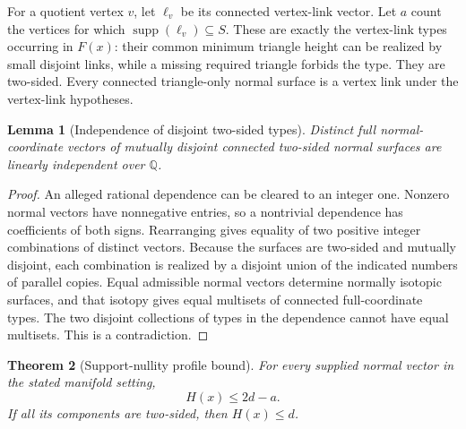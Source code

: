 \documentclass[11pt,a4paper]{article}
\newtheorem{theorem}{Theorem}[section]
\newtheorem{lemma}[theorem]{Lemma}
\theoremstyle{definition}
\newcommand{\Q}{\mathbb Q}
\newcommand{\supp}{\operatorname{supp}}
\begin{document}
For a quotient vertex $v$, let $\ell_v$ be its connected vertex-link vector.
Let $a$ count the vertices for which $\supp(\ell_v)\subseteq S$.  These are
exactly the vertex-link types occurring in $F(x)$: their common minimum
triangle height can be realized by small disjoint links, while a missing
required triangle forbids the type.  They are two-sided.  Every connected
triangle-only normal surface is a vertex link under the vertex-link hypotheses.

\begin{lemma}[Independence of disjoint two-sided types]
\label{lem:independence}
Distinct full normal-coordinate vectors of mutually disjoint connected
two-sided normal surfaces are linearly independent over $\Q$.
\end{lemma}

\begin{proof}
An alleged rational dependence can be cleared to an integer one.  Nonzero
normal vectors have nonnegative entries, so a nontrivial dependence has
coefficients of both signs.  Rearranging gives equality of two positive
integer combinations of distinct vectors.  Because the surfaces are
two-sided and mutually disjoint, each combination is realized by a disjoint
union of the indicated numbers of parallel copies.  Equal admissible normal
vectors determine normally isotopic surfaces, and that isotopy gives equal
multisets of connected full-coordinate types.  The two disjoint collections
of types in the dependence cannot have equal multisets.  This is a contradiction.
\end{proof}

\begin{theorem}[Support-nullity profile bound]
\label{thm:profile}
For every supplied normal vector in the stated manifold setting,
\begin{equation}
 H(x)\le 2d-a.                                \label{eq:profile}
\end{equation}
If all its components are two-sided, then $H(x)\le d$.
\end{theorem}
\end{document}
